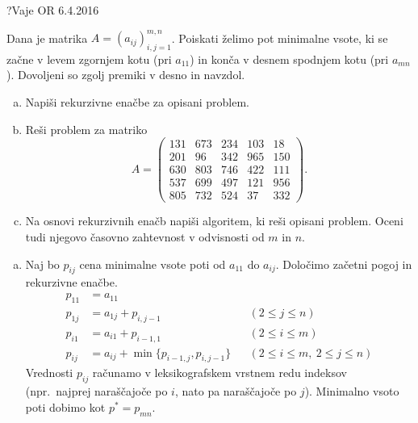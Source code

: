 \begin{naloga}{?}{Vaje OR 6.4.2016}
\begin{vprasanje}
Dana je matrika $A = (a_{ij})_{i,j=1}^{m,n}$.
Poiskati želimo pot minimalne vsote,
ki se začne v levem zgornjem kotu (pri $a_{11}$)
in konča v desnem spodnjem kotu (pri $a_{mn}$).
Dovoljeni so zgolj premiki v desno in navzdol.
\begin{enumerate}[(a)]
\item Napiši rekurzivne enačbe za opisani problem.
\item Reši problem za matriko
$$
A = \begin{pmatrix}
131 & 673 & 234 & 103 &  18 \\
201 &  96 & 342 & 965 & 150 \\
630 & 803 & 746 & 422 & 111 \\
537 & 699 & 497 & 121 & 956 \\
805 & 732 & 524 &  37 & 332
\end{pmatrix} .
$$
\item Na osnovi rekurzivnih enačb napiši algoritem, ki reši opisani problem.
Oceni tudi njegovo časovno zahtevnost v odvisnosti od $m$ in $n$.
\end{enumerate}
\end{vprasanje}

\begin{odgovor}
\begin{enumerate}[(a)]
\item Naj bo $p_{ij}$ cena minimalne vsote poti od $a_{11}$ do $a_{ij}$.
Določimo začetni pogoj in rekurzivne enačbe.
\begin{align*}
p_{11} &= a_{11} \\
p_{1j} &= a_{1j} + p_{i,j-1} && (2 \le j \le n) \\
p_{i1} &= a_{i1} + p_{i-1,1} && (2 \le i \le m) \\
p_{ij} &= a_{ij} + \min\{p_{i-1,j}, p_{i,j-1}\}
&& (2 \le i \le m, \ 2 \le j \le n)
\end{align*}
Vrednosti $p_{ij}$ računamo v leksikografskem vrstnem redu indeksov
(npr.~najprej naraščajoče po $i$, nato pa naraščajoče po $j$).
Minimalno vsoto poti dobimo kot $p^* = p_{mn}$.


\end{enumerate}
\end{odgovor}
\end{naloga}
